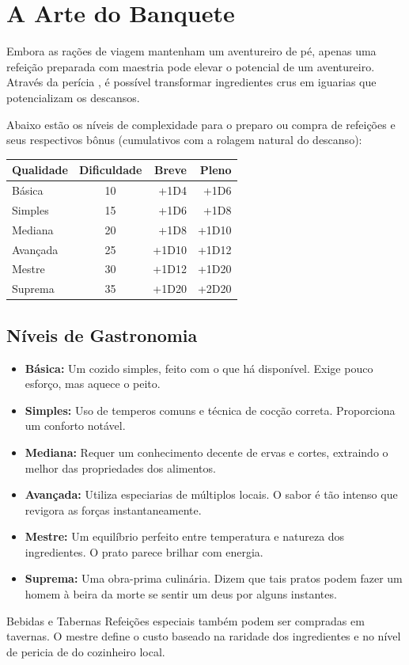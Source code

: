 \section*{A Arte do Banquete}

Embora as rações de viagem mantenham um aventureiro de pé, apenas uma refeição preparada com maestria pode elevar o potencial de um aventureiro. Através da perícia , é possível transformar ingredientes crus em iguarias que potencializam os descansos.

Abaixo estão os níveis de complexidade para o preparo ou compra de refeições e seus respectivos bônus (cumulativos com a rolagem natural do descanso):

\begin{center}
    \small 
    \renewcommand{\arraystretch}{1.4}
    \begin{tabularx}{\columnwidth}{@{} l c r r @{}}
        \toprule
        \rowcolor{gray!15} 
        \textbf{Qualidade} & \textbf{Dificuldade} & \textbf{Breve} & \textbf{Pleno} \\ 
        \midrule
        Básica      & 10 & +1D4  & +1D6  \\
        Simples     & 15 & +1D6  & +1D8  \\
        Mediana     & 20 & +1D8  & +1D10 \\
        Avançada    & 25 & +1D10 & +1D12 \\
        Mestre      & 30 & +1D12 & +1D20 \\
        \rowcolor{overgrownRed!10}
        Suprema     & 35 & +1D20 & +2D20 \\
        \bottomrule
    \end{tabularx}
\end{center}

\subsection*{Níveis de Gastronomia}

\begin{itemize}
    \item \textbf{Básica:} Um cozido simples, feito com o que há disponível. Exige pouco esforço, mas aquece o peito.
    \item \textbf{Simples:} Uso de temperos comuns e técnica de cocção correta. Proporciona um conforto notável.
    \item \textbf{Mediana:} Requer um conhecimento decente de ervas e cortes, extraindo o melhor das propriedades dos alimentos.
    \item \textbf{Avançada:} Utiliza especiarias de múltiplos locais. O sabor é tão intenso que revigora as forças instantaneamente.
    \item \textbf{Mestre:} Um equilíbrio perfeito entre temperatura e natureza dos ingredientes. O prato parece brilhar com energia.
    \item \textbf{Suprema:} Uma obra-prima culinária. Dizem que tais pratos podem fazer um homem à beira da morte se sentir um deus por alguns instantes.
\end{itemize}

\begin{rpgboxtips}{Bebidas e Tabernas}
Refeições especiais também podem ser compradas em tavernas. O mestre define o custo baseado na raridade dos ingredientes e no nível de pericia de  do cozinheiro local.
\end{rpgboxtips}